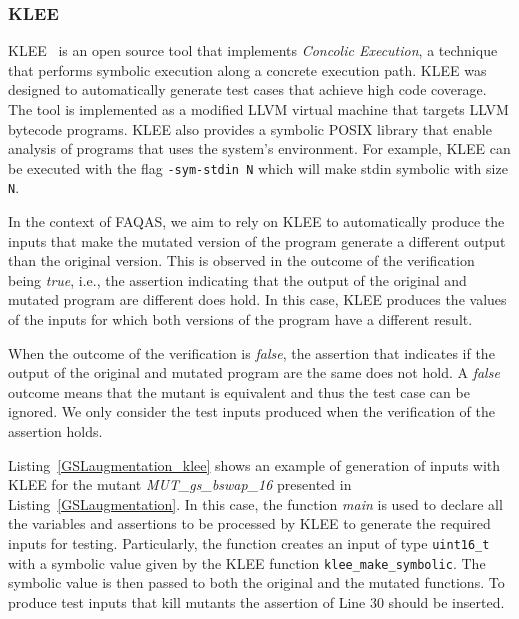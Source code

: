 
\subsubsection{KLEE}

KLEE~\cite{cadar2008klee} is an open source tool that implements {\em Concolic Execution}, a technique that performs symbolic execution along a concrete execution path. KLEE was designed to automatically generate test cases that achieve high code coverage. The tool is implemented as a modified LLVM virtual machine that targets LLVM bytecode programs.
KLEE also provides a symbolic POSIX library that enable analysis of programs that uses the system's environment. For example, KLEE can be executed with the flag \texttt{-sym-stdin N} which will make stdin symbolic with size \texttt{N}.  

In the context of FAQAS, we aim to rely on KLEE to automatically produce the inputs that make the mutated version of the program generate a different output than the original version.
This is observed in the outcome of the verification being \emph{true}, i.e., the assertion indicating that the output of the original and mutated program are different does hold. In this case, KLEE produces the values of the inputs for which both versions of the program have a different result.

When the outcome of the verification is \emph{false}, the assertion that indicates if the output of the original and mutated program are the same does not hold. A \emph{false} outcome means that the mutant is equivalent and thus the test case can be ignored. 
We only consider the test inputs produced when the verification of the assertion holds.



Listing~\ref{GSLaugmentation_klee} shows an example of generation of inputs with KLEE for the mutant \linebreak\emph{MUT\_gs\_bswap\_16} presented in Listing~\ref{GSLaugmentation}. In this case, the function \emph{main} is used to declare all the variables and assertions to be processed by KLEE to generate the required inputs for testing. Particularly, the function creates an input of type \texttt{uint16\_t} with a symbolic value given by the KLEE function \texttt{klee\_make\_symbolic}. The symbolic value is then passed to both the original and the mutated functions. To produce test inputs that kill mutants the assertion of Line 30 should be inserted.

